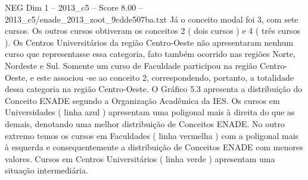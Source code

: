 \begin{textsample}{NEG Dim 1 – 2013\_c5 – Score 8.00 – 2013\_c5/enade\_2013\_zoot\_9cdde507ba.txt}
Já o conceito modal foi 3, com sete cursos.
Os outros cursos obtiveram os conceitos 2 ( dois cursos ) e 4 ( três cursos ).
Os Centros Universitários da região Centro-Oeste não apresentaram nenhum curso que representasse essa categoria, fato também ocorrido nas regiões Norte, Nordeste e Sul.
Somente um curso de Faculdade participou na região Centro-Oeste, e este associou -se ao conceito 2, correspondendo, portanto, a totalidade dessa categoria na região Centro-Oeste.
O Gráfico 5.3 apresenta a distribuição do Conceito ENADE segundo a Organização Acadêmica da IES.
Os cursos em Universidades ( linha azul ) apresentam uma poligonal mais à direita do que as demais, denotando uma melhor distribuição de Conceitos ENADE.
No outro extremo temos os cursos em Faculdades ( linha vermelha ) com a poligonal mais à esquerda e consequentemente a distribuição de Conceitos ENADE com menores valores.
Cursos em Centros Universitários ( linha verde ) apresentam uma situação intermediária.

\end{textsample}
